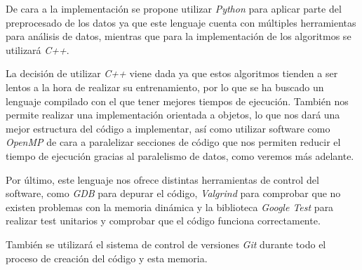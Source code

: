 De cara a la implementación se propone utilizar \textit{Python} para aplicar parte del preprocesado de los datos ya que este lenguaje cuenta con múltiples herramientas para análisis de datos, mientras que para la implementación de los algoritmos se utilizará \textit{C++}.

La decisión de utilizar \textit{C++} viene dada ya que estos algoritmos tienden a ser lentos a la hora de realizar su entrenamiento, por lo que se ha buscado un lenguaje compilado con el que tener mejores tiempos de ejecución. También nos permite realizar una implementación orientada a objetos, lo que nos dará una mejor estructura del código a implementar, así como utilizar software como \textit{OpenMP} \cite{OpenMP} de cara a paralelizar secciones de código que nos permiten reducir el tiempo de ejecución gracias al paralelismo de datos, como veremos más adelante.

Por último, este lenguaje nos ofrece distintas herramientas de control del software, como \textit{GDB} \cite{gdb} para depurar el código, \textit{Valgrind} \cite{valgrind} para comprobar que no existen problemas con la memoria dinámica y la biblioteca \textit{Google Test} \cite{gtest} para realizar test unitarios y comprobar que el código funciona correctamente.

También se utilizará el sistema de control de versiones \textit{Git} \cite{git} durante todo el proceso de creación del código y esta memoria.


\newpage
